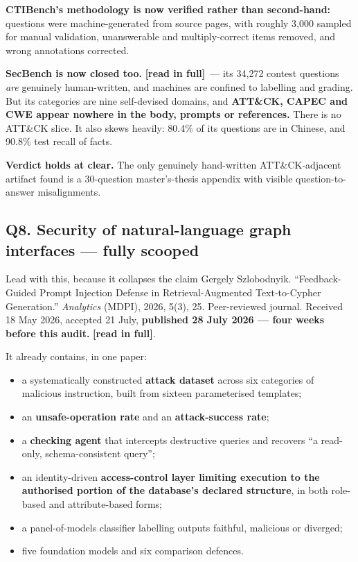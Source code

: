 \documentclass[11pt,a4paper]{article}
\newcommand{\vkilled}{\textcolor{killed}{\textbf{fully scooped}}}
\newcommand{\readtag}{\textcolor{standing}{\textbf{[read in full]}}}
\begin{document}
\textbf{CTIBench's methodology is now verified rather than second-hand:} questions
were machine-generated from source pages, with roughly 3{,}000 sampled for manual
validation, unanswerable and multiply-correct items removed, and wrong annotations
corrected.

\textbf{SecBench is now closed too.} \readtag\ --- its 34{,}272 contest questions
\emph{are} genuinely human-written, and machines are confined to labelling and
grading. But its categories are nine self-devised domains, and \textbf{ATT\&CK,
CAPEC and CWE appear nowhere in the body, prompts or references.} There is no
ATT\&CK slice. It also skews heavily: 80.4\% of its questions are in Chinese, and
90.8\% test recall of facts.

\textbf{Verdict holds at clear.} The only genuinely hand-written ATT\&CK-adjacent
artifact found is a 30-question master's-thesis appendix with visible
question-to-answer misalignments.

\subsection{Q8. Security of natural-language graph interfaces --- \texorpdfstring{\vkilled}{fully scooped}}

\begin{alertbox}{Lead with this, because it collapses the claim}
Gergely Szlobodnyik. ``Feedback-Guided Prompt Injection Defense in
Retrieval-Augmented Text-to-Cypher Generation.'' \emph{Analytics} (MDPI), 2026,
5(3), 25. Peer-reviewed journal. Received 18 May 2026, accepted 21 July,
\textbf{published 28 July 2026 --- four weeks before this audit.} \readtag.
\end{alertbox}

It already contains, in one paper:

\begin{itemize}
\item a systematically constructed \textbf{attack dataset} across six categories of
      malicious instruction, built from sixteen parameterised templates;
\item an \textbf{unsafe-operation rate} and an \textbf{attack-success rate};
\item a \textbf{checking agent} that intercepts destructive queries and recovers ``a
      read-only, schema-consistent query'';
\item an identity-driven \textbf{access-control layer limiting execution to the
      authorised portion of the database's declared structure}, in both role-based
      and attribute-based forms;
\item a panel-of-models classifier labelling outputs faithful, malicious or diverged;
\item five foundation models and six comparison defences.
\end{itemize}
\end{document}
